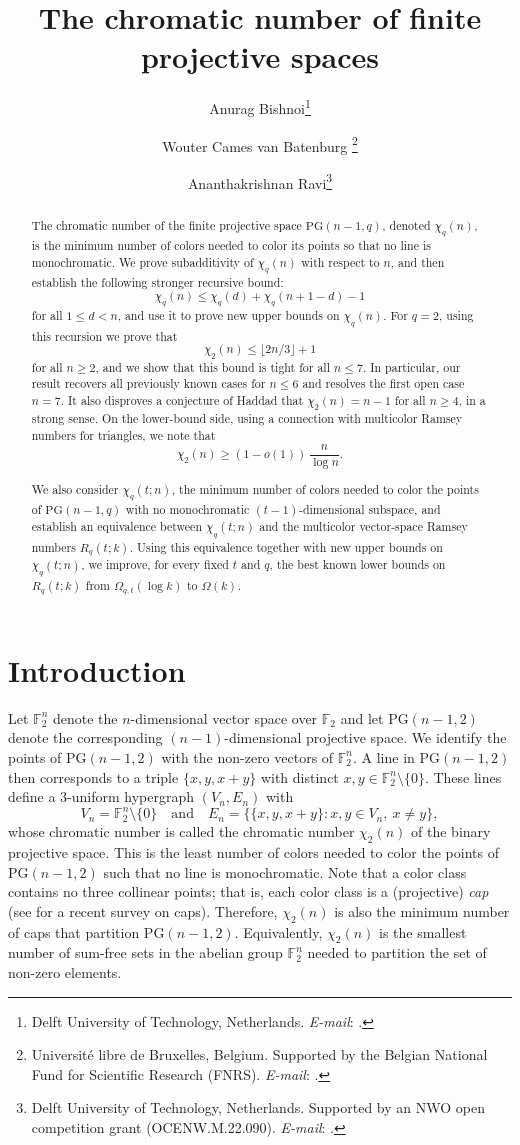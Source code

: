 \documentclass[11pt]{article}
\title{The chromatic number of finite projective spaces}
\author{
Anurag Bishnoi\thanks{Delft University of Technology, Netherlands. \emph{E-mail}: \text{a.bishnoi@tudelft.nl}.} 
\and
Wouter Cames van Batenburg \thanks{Universit\'e libre de Bruxelles, Belgium. Supported by the Belgian National Fund for Scientific Research (FNRS). \emph{E-mail}: \text{w.p.s.camesvanbatenburg@gmail.com}. }
\and 
Ananthakrishnan Ravi\thanks{Delft University of Technology, Netherlands. Supported by an NWO open competition
grant (OCENW.M.22.090). \emph{E-mail}: \text{a.ravi@tudelft.nl}.}
}
\date{}
\theoremstyle{plain}
\newcommand{\F}{\mathbb{F}}
\newcommand{\PG}{\mathrm{PG}}
\begin{document}
\maketitle

\begin{abstract}
The chromatic number of the finite projective space $\mathrm{PG}(n-1,q)$, denoted $\chi_q(n)$, is the minimum number of colors needed to color its points so that no line is monochromatic.
We prove subadditivity of $\chi_q(n)$ with respect to $n$, and then establish the following  stronger recursive bound:
\[
\chi_q(n)\le \chi_q(d)+\chi_q(n+1-d)-1
\] 
for all $1 \leq d < n$, and use it to prove new upper bounds on $\chi_q(n)$.
For $q = 2$, using this recursion we prove that 
\[
\chi_2(n) \le \lfloor 2n/3 \rfloor + 1
\]
for all $n \ge 2$, and we show that this bound is tight for all $n \le 7$. 
In particular, our result recovers all previously known cases for $n \le 6$ and resolves the first open case $n = 7$. 
It also disproves a conjecture of Haddad that $\chi_2(n) = n - 1$ for all $n \geq 4$, in a strong sense. 
On the lower-bound side, using a connection with multicolor Ramsey numbers for triangles, we note that
\[
\chi_2(n) \ge (1 - o(1))\,\frac{n}{\log n}.
\]

We also consider $\chi_q(t;n)$, the minimum number of colors needed to color the points of $\mathrm{PG}(n-1,q)$ with no monochromatic $(t - 1)$-dimensional subspace, and establish an equivalence between $\chi_q(t;n)$ and the multicolor vector-space Ramsey numbers $R_q(t;k)$. 
Using this equivalence together with new upper bounds on $\chi_q(t;n)$, we improve, for every fixed $t$ and $q$, the best known lower bounds on $R_q(t;k)$ from $\Omega_{q,t}(\log k)$ to $\Omega(k)$. 
\end{abstract}

\section{Introduction}\label{sec:intro}

Let $\F_2^n$ denote the $n$-dimensional vector space over $\F_2$ and let $\PG(n-1,2)$ denote the corresponding $(n-1)$-dimensional projective space.
We identify the points of $\PG(n-1,2)$ with the non-zero vectors of $\F_2^n$.
A line in $\mathrm{PG}(n - 1, 2)$ then corresponds to a triple $\{x,y,x+y\}$ with distinct $x,y\in \F_2^n\setminus\{0\}$. 
These lines define a $3$-uniform hypergraph $(V_n, E_n)$ with
\[
  V_n=\F_2^n \setminus \{0\}
  \quad\text{and}\quad
  E_n=\bigl\{\{x,y,x+y\}: x,y\in V_n,\ x\neq y\bigr\},
\]
whose chromatic number is called the chromatic number $\chi_2(n)$ of the binary projective space. 
This is the least number of colors needed to color the points of $\PG(n - 1, 2)$ such that no line is monochromatic. 
Note that a color class contains no three collinear points; that is, each color class is a (projective) \textit{cap} (see \cite{HirschfeldThas2025} for a recent survey on caps).
Therefore, $\chi_2(n)$ is also the minimum number of caps that partition $\PG(n-1,2)$. 
Equivalently, $\chi_2(n)$ is the smallest number of sum-free sets in the abelian group $\mathbb{F}_2^n$ needed to partition the set of non-zero elements.
\end{document}
